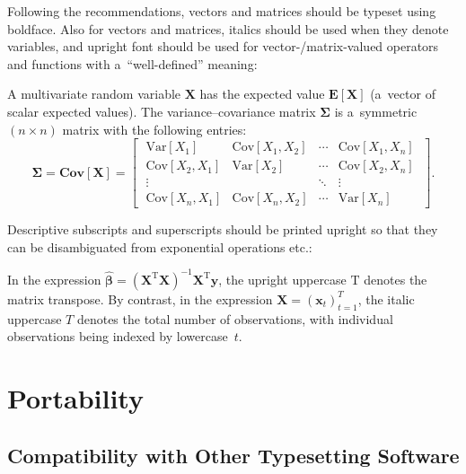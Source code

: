\documentclass[11pt, a4paper, oneside]{article}
\renewcommand{\caps}[1]{{\textscale{0.97}{\textls[50]{\MakeUppercase{#1}}}}}
\theoremstyle{Plain}
\theoremstyle{Definition}
\theoremstyle{Remark}
\begin{document}
Following the \caps{ISO} recommendations, vectors and matrices should be typeset using boldface. Also for vectors and matrices, italics should be used when they denote variables, and upright font should be used for vector-\slash matrix-valued operators and functions with a~``well-defined'' meaning:
\begin{longtblr}{}
	\begin{minipage}{\linewidth}\noindent%
		A multivariate random variable $\bm{X}$ has the expected value $\mathbf{E}[\boldsymbol{X}]$ (a~vector of scalar expected values). The variance--covariance matrix $\bm{\Sigma}$ is a~symmetric ${(n \times n)}$ matrix with the following entries:
		\vspace{-0.75\smallskipamount}%
		\begin{equation}
			\bm{\Sigma} = \mathbf{Cov}[\bm{X}] =
			\left[\;\begin{matrix}
				\mathrm{Var}[X_1] & \mathrm{Cov}[X_1, X_2] & \cdots & \mathrm{Cov}[X_1, X_n] \\
				\mathrm{Cov}[X_2, X_1] & \mathrm{Var}[X_2] & \cdots & \mathrm{Cov}[X_2, X_n]
				\\
				\vdots & & \ddots & \vdots \\
				\mathrm{Cov}[X_n, X_1] & \mathrm{Cov}[X_n, X_2] & \cdots & \mathrm{Var}[X_n]
			\end{matrix}\;\right].
		\end{equation}
	\end{minipage}\vspace{0.1\smallskipamount}
\end{longtblr}

Descriptive subscripts and superscripts should be printed upright so that they can be disambiguated from exponential operations etc.:
\begin{longtblr}{}
	In the expression ${\hat{\bm{\beta}} = (\bm{X}^\mathrm{T}\bm{X})^{-1}\bm{X}^\mathrm{T}\bm{y}}$, the upright uppercase $\mathrm{T}$ denotes the matrix transpose. By contrast, in the expression ${\bm{X} = (\bm{x}_t)_{t = 1}^T}$, the italic uppercase $T$ denotes the total number of observations, with individual observations being indexed by lowercase~$t$.
\end{longtblr}

\endgroup


\section{Portability}

\subsection{Compatibility with Other Typesetting Software}
\label{sec:portability:compatibility}
\end{document}
